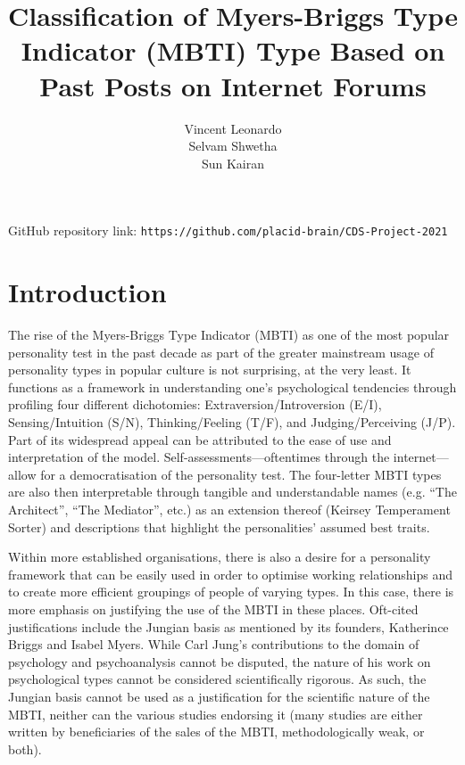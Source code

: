 \documentclass[11pt,a4paper]{article}
\title{Classification of Myers-Briggs Type Indicator (MBTI) Type Based on Past Posts on Internet Forums}
\author{Vincent Leonardo\\Selvam Shwetha\\Sun Kairan}
\begin{document}
	
	\maketitle
	
	\vfill
	\begin{center}
			GitHub repository link: \texttt{https://github.com/placid-brain/CDS-Project-2021}
	\end{center}

	\newpage
	
	\tableofcontents
	\newpage

	\section{Introduction}
	
	The rise of the Myers-Briggs Type Indicator (MBTI) as one of the most popular personality test in the past decade as part of the greater mainstream usage of personality types in popular culture is not surprising, at the very least. It functions as a framework in understanding one’s psychological tendencies through profiling four different dichotomies: Extraversion/Introversion (E/I), Sensing/Intuition (S/N), Thinking/Feeling (T/F), and Judging/Perceiving (J/P).\autocite{myersGiftsDifferingUnderstanding1995} Part of its widespread appeal can be attributed to the ease of use and interpretation of the model.\autocite{choongPredictingJudgingperceivingMyersBriggs2021} Self-assessments—oftentimes through the internet—allow for a democratisation of the personality test.\autocite{choongPredictingJudgingperceivingMyersBriggs2021} The four-letter MBTI types are also then interpretable through tangible and understandable names (e.g. “The Architect”, “The Mediator”, etc.) as an extension thereof (Keirsey Temperament Sorter) and descriptions that highlight the personalities’ assumed best traits.\autocite{lilienfeldSciencePseudoscienceClinical2014}
	
	Within more established organisations, there is also a desire for a personality framework that can be easily used in order to optimise working relationships and to create more efficient groupings of people of varying types.\autocite{lakeTrustNameBrand2019} In this case, there is more emphasis on justifying the use of the MBTI in these places. Oft-cited justifications include the Jungian basis as mentioned by its founders, Katherince Briggs and Isabel Myers. While Carl Jung’s contributions to the domain of psychology and psychoanalysis cannot be disputed, the nature of his work on psychological types cannot be considered scientifically rigorous.\autocite{carrollMyersBriggsTypeIndicator} As such, the Jungian basis cannot be used as a justification for the scientific nature of the MBTI, neither can the various studies endorsing it (many studies are either written by beneficiaries of the sales of the MBTI, methodologically weak, or both).\autocite{coffieldLearningStylesPedagogy2004}
	
\end{document}
